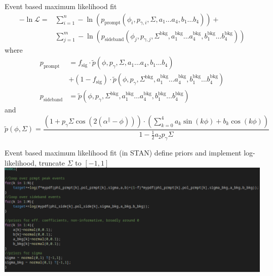 \documentclass[11pt,aspectratio=169,dvipsnames]{beamer}
\newcommand{\thedate}{30th March 2022}
\begin{document}
	
\begin{frame}{Event based maximum likelihood fit}
	\begin{align*}
		-\ln\mathcal{L}=&\sum_{i=1}^{n}-\ln(p_\text{prompt}(\phi_i,p_{\gamma,i},\Sigma,a_1\dots a_4,b_1\dots b_4))+\\
		&\sum_{j=1}^{m}-\ln\left(p_\text{sideband}(\phi_j,p_{\gamma,j},\Sigma^\text{bkg},a_1^\text{bkg}\dots a_4^\text{bkg},b_1^\text{bkg}\dots b_4^\text{bkg})\right)
	\end{align*}
where
\begin{align*}
	p_\text{prompt}&=f_{\text{sig}}\cdot\tilde{p}(\phi,p_\gamma,\Sigma,a_1\dots a_4, b_1\dots b_4)\\ &+ \left(1-f_\text{sig}\right)\cdot\tilde{p}(\phi,p_\gamma,\Sigma^\text{bkg},a_1^\text{bkg}\dots a_4^\text{bkg}, b_1^\text{bkg}\dots b_4^\text{bkg})\\
	p_\text{sideband}&=\tilde{p}(\phi,p_\gamma,\Sigma^\text{bkg},a_1^\text{bkg}\dots a_4^\text{bkg}, b_1^\text{bkg}\dots b_4^\text{bkg})
\end{align*}
and \begin{equation*}
	\tilde{p}(\phi,\Sigma)=\frac{\left(1+p_\gamma\Sigma\cos\left(2\left(\alpha^\parallel-\phi\right)\right)\right)\cdot\left(\sum_{k=0}^{4}a_k\sin(k\phi)+b_k\cos(k\phi)\right)}{1-\frac{1}{2}a_2p_\gamma\Sigma}
\end{equation*}
\end{frame}
\begin{frame}{Event based maximum likelihood fit (in STAN)}
define priors and implement log-likelihood, truncate $\Sigma$ to $[-1,1]$
\includegraphics[width=\linewidth]{stan_snippet.png}	
	
\end{frame}
\end{document}
